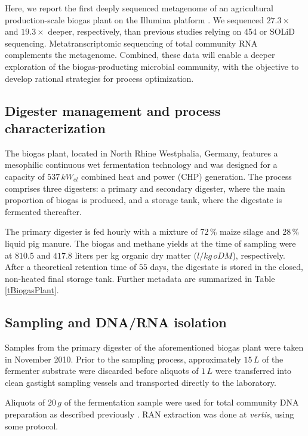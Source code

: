 \documentclass{bmcart}
\begin{document}
Here, we report the first deeply sequenced metagenome of an agricultural production-scale biogas plant on the Illumina platform \cite{GigaScience}.
We sequenced $27.3 \times$ and $19.3 \times$ deeper, respectively, than previous studies relying on 454 \cite{Jaenicke2011} or SOLiD \cite{Wirth2012} sequencing. Metatranscriptomic sequencing of total community RNA complements the metagenome.
Combined, these data will enable a deeper exploration of the biogas-producting microbial community, with the objective to develop rational strategies for process optimization.

\subsection*{Digester management and process characterization}
The biogas plant, located in North Rhine Westphalia, Germany, features a mesophilic continuous wet fermentation technology and was designed for a capacity of $537\,kW_{el}$ combined heat and power (CHP) generation.
The process comprises three digesters: a primary and secondary digester, where the main proportion of biogas is produced, and a storage tank, where the digestate is fermented thereafter.

The primary digester is fed hourly with a mixture of $72\,\%$ maize silage and $28\,\%$ liquid pig manure.
The biogas and methane yields at the time of sampling were at $810.5$ and $417.8$ liters per kg organic dry matter ($l / kg\,oDM$), respectively.
After a theoretical retention time of $55$ days, the digestate is stored in the closed, non-heated final storage tank.
Further metadata are summarized in Table \ref{tBiogasPlant}.

\subsection*{Sampling and DNA/RNA isolation}
Samples from the primary digester of the aforementioned biogas plant were taken in November 2010.
Prior to the sampling process, approximately $15\,L$ of the fermenter substrate were discarded before aliquots of $1\,L$ were transferred into clean gastight sampling vessels and transported directly to the laboratory.

Aliquots of $20\,g$ of the fermentation sample were used for total community DNA preparation as described previously \cite{Schlueter2008}. RAN extraction was done at \emph{vertis}, using some protocol.
\end{document}
